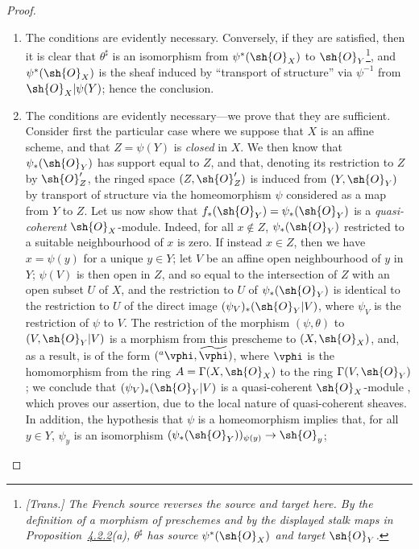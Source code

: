 \begin{proof}
\medskip\noindent
\begin{enumerate}
  \item[(a)] The conditions are evidently necessary.
    Conversely, if they are satisfied, then it is clear that $\theta^\sharp$ is an isomorphism from $\psi^*(\sh{O}_X)$ to $\sh{O}_Y$\footnote{\emph{[Trans.] The French source reverses the source and target here. By the definition of a morphism of preschemes and by the displayed stalk maps in Proposition~\hyperref[I.4.2.2]{4.2.2}(a), $\theta^\sharp$ has source $\psi^*(\sh{O}_X)$ and target $\sh{O}_Y$.}}, and $\psi^*(\sh{O}_X)$ is the sheaf induced by ``transport of structure'' via $\psi^{-1}$ from $\sh{O}_X|\psi(Y)$;
    hence the conclusion.
  \item[(b)] The conditions are evidently necessary---we prove that they are sufficient.
    Consider first the particular case where we suppose that $X$ is an affine scheme, and that $Z=\psi(Y)$ is \emph{closed} in $X$.
    We then know  that $\psi_*(\sh{O}_Y)$ has support equal to $Z$, and that, denoting its restriction to $Z$ by $\sh{O}_Z'$, the ringed space $(Z,\sh{O}_Z')$ is induced from $(Y,\sh{O}_Y)$ by transport of structure via the homeomorphism $\psi$ considered as a map from $Y$ to $Z$.
    Let us now show that $f_*(\sh{O}_Y)=\psi_*(\sh{O}_Y)$ is a \emph{quasi-coherent} $\sh{O}_X$-module.
    Indeed, for all $x\not\in Z$, $\psi_*(\sh{O}_Y)$ restricted to a suitable neighbourhood of $x$ is zero.
    If instead $x\in Z$, then we have $x=\psi(y)$ for a unique $y\in Y$;
    let $V$ be an affine open neighbourhood of $y$ in $Y$;
    $\psi(V)$ is then open in $Z$, and so equal to the intersection of $Z$ with an open subset $U$ of $X$, and the restriction to $U$ of $\psi_*(\sh{O}_Y)$ is identical to the restriction to $U$ of the direct image
    $(\psi_V)_*(\sh{O}_Y|V)$, where $\psi_V$ is the restriction of $\psi$ to $V$.
    The restriction of the morphism $(\psi,\theta)$ to $(V,\sh{O}_Y|V)$ is a morphism from this prescheme to $(X,\sh{O}_X)$, and, as a result, is of the form $({}^a\vphi,\widetilde{\vphi})$, where $\vphi$ is the homomorphism from the ring $A=\Gamma(X,\sh{O}_X)$ to the ring $\Gamma(V,\sh{O}_Y)$ ;
    we conclude that $(\psi_V)_*(\sh{O}_Y|V)$ is a quasi-coherent $\sh{O}_X$-module , which proves our assertion, due to the local nature of quasi-coherent sheaves.
    In addition, the hypothesis that $\psi$ is a homeomorphism implies  that, for all $y\in Y$, $\psi_y$ is an isomorphism $(\psi_*(\sh{O}_Y))_{\psi(y)}\to\sh{O}_y$;

\end{enumerate}
\end{proof}
